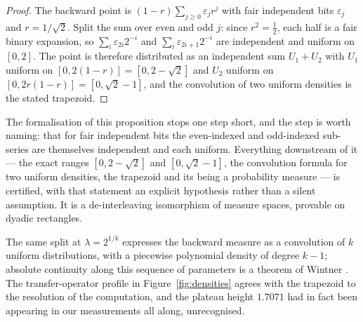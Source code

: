 \documentclass[11pt,reqno]{amsart}
\theoremstyle{plain}
\theoremstyle{definition}
\theoremstyle{remark}
\begin{document}
\begin{proof}
The backward point is $(1-r)\sum_{j\geq0}\varepsilon_jr^j$ with fair
independent bits $\varepsilon_j$ and $r=1/\sqrt2$. Split the sum over even and
odd $j$: since $r^2=\tfrac12$, each half is a fair binary expansion, so
$\sum_i\varepsilon_{2i}2^{-i}$ and $\sum_i\varepsilon_{2i+1}2^{-i}$ are
independent and uniform on $[0,2]$. The point is therefore distributed as an
independent sum $U_1+U_2$ with $U_1$ uniform on $[0,2(1-r)]=[0,2-\sqrt2]$ and
$U_2$ uniform on $[0,2r(1-r)]=[0,\sqrt2-1]$, and the convolution of two
uniform densities is the stated trapezoid.
\end{proof}

The formalisation of this proposition stops one step short, and the step is
worth naming: that for fair independent bits the even-indexed and odd-indexed
sub-series are themselves independent and each uniform. Everything downstream
of it --- the exact ranges $[0,2-\sqrt2]$ and $[0,\sqrt2-1]$, the convolution
formula for two uniform densities, the trapezoid and its being a probability
measure --- is certified, with that statement an explicit hypothesis rather
than a silent assumption. It is a de-interleaving isomorphism of measure
spaces, provable on dyadic rectangles.

The same split at $\lambda=2^{1/k}$ expresses the backward measure as a
convolution of $k$ uniform distributions, with a piecewise polynomial density
of degree $k-1$; absolute continuity along this sequence of parameters is a
theorem of Wintner \cite{Wintner1935}. The transfer-operator profile in
Figure~\ref{fig:densities} agrees with the trapezoid to the resolution of the
computation, and the plateau height $1.7071$ had in fact been appearing in our
measurements all along, unrecognised.
\end{document}
